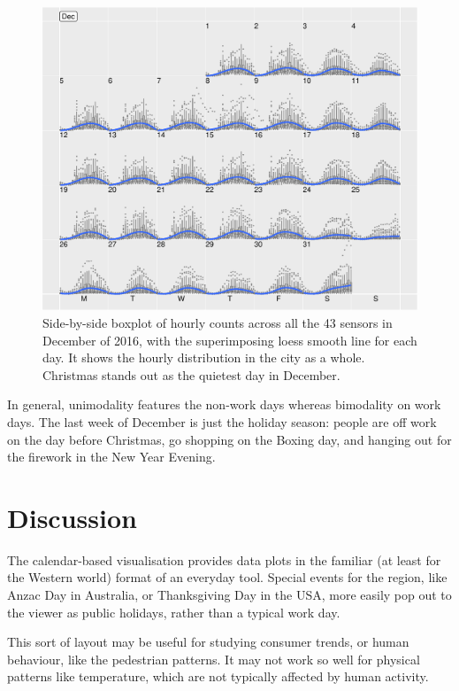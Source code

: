 \documentclass[article]{jss}
\begin{document}
\begin{CodeChunk}
\begin{figure}

{\centering \includegraphics[width=\textwidth]{figure/boxplot-1} 

}

\caption[Side-by-side boxplot of hourly counts across all the 43 sensors in December of 2016, with the superimposing loess smooth line for each day]{Side-by-side boxplot of hourly counts across all the 43 sensors in December of 2016, with the superimposing loess smooth line for each day. It shows the hourly distribution in the city as a whole. Christmas stands out as the quietest day in December.}\label{fig:boxplot}
\end{figure}
\end{CodeChunk}

In general, unimodality features the non-work days whereas bimodality on
work days. The last week of December is just the holiday season: people
are off work on the day before Christmas, go shopping on the Boxing day,
and hanging out for the firework in the New Year Evening.

\section{Discussion}\label{discussion}

\label{sec:discussion}

The calendar-based visualisation provides data plots in the familiar (at
least for the Western world) format of an everyday tool. Special events
for the region, like Anzac Day in Australia, or Thanksgiving Day in the
USA, more easily pop out to the viewer as public holidays, rather than a
typical work day.

This sort of layout may be useful for studying consumer trends, or human
behaviour, like the pedestrian patterns. It may not work so well for
physical patterns like temperature, which are not typically affected by
human activity.


\end{document}
